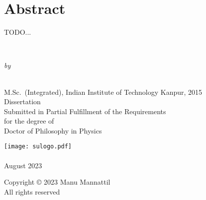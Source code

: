 


\frontmatter

\chapter*{Abstract}
\thispagestyle{empty}

TODO...

\makeatletter
  \if@twoside\blankpage\fi
\makeatother


\newpage\thispagestyle{empty}

\begin{center*}
  \begin{Spacing}{2.0}
  {\LARGE{}}\\
  \end{Spacing}
  \vspace{3em}
  \emph{by}\\[3em]
  \\
  \vspace{1em}
  \begin{Spacing}{1.25}
  M.Sc.~(Integrated), Indian Institute of Technology Kanpur, 2015\\[5em]
  Dissertation\\
  Submitted in Partial Fulfillment of the Requirements\\
  for the degree of\\
  Doctor of Philosophy in Physics\\[5em]
  \end{Spacing}
  \texttt{[image: sulogo.pdf]}\\[1em]
  \\[1em]
  August 2023
\end{center*}


\newpage\thispagestyle{empty}

\begin{center*}
  \begin{Spacing}{1.25}
  Copyright {\copyright} 2023 Manu Mannattil\\
  All rights reserved
  \end{Spacing}
\end{center*}

